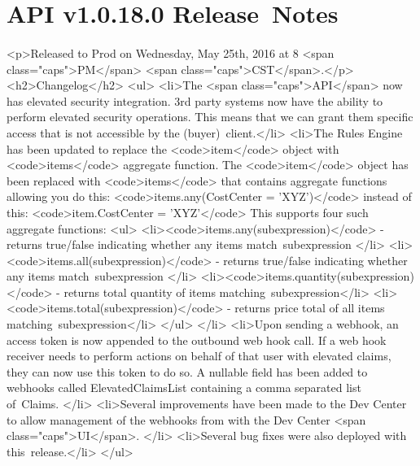 \documentclass{memoir}%
\begin{document}
%
\section*{API v1.0.18.0 Release~Notes}%
\paragraph*{}%

%
\paragraph*{}%
<p>Released to Prod on Wednesday, May 25th, 2016 at 8 <span class="caps">PM</span> <span class="caps">CST</span>.</p>\newline%
<h2>Changelog</h2>\newline%
<ul>\newline%
<li>The <span class="caps">API</span> now has elevated security integration. 3rd party systems now have the ability to perform elevated security operations. This means that we can grant them specific access that is not accessible by the (buyer)~client.</li>\newline%
<li>The Rules Engine has been updated to replace the <code>item</code> object with <code>items</code> aggregate function. The <code>item</code> object has been replaced with <code>items</code> that contains aggregate functions allowing you do this: <code>items.any(CostCenter = 'XYZ')</code> instead of this: <code>item.CostCenter = 'XYZ'</code> This supports four such aggregate functions: <ul>\newline%
<li><code>items.any(subexpression)</code> {-} returns true/false indicating whether any items match~subexpression </li>\newline%
<li><code>items.all(subexpression)</code> {-} returns true/false indicating whether any items match~subexpression </li>\newline%
<li><code>items.quantity(subexpression)</code> {-} returns total quantity of items matching~subexpression</li>\newline%
<li><code>items.total(subexpression)</code> {-} returns price total of all items matching~subexpression</li>\newline%
</ul>\newline%
</li>\newline%
<li>Upon sending a webhook, an access token is now appended to the outbound web hook call. If a web hook receiver needs to perform actions on behalf of that user with elevated claims, they can now use this token to do so. A nullable field has been added to webhooks called ElevatedClaimsList containing a comma separated list of~Claims. </li>\newline%
<li>Several improvements have been made to the Dev Center to allow management of the webhooks from with the Dev Center <span class="caps">UI</span>. </li>\newline%
<li>Several bug fixes were also deployed with this~release.</li>\newline%
</ul>
\end{document}

